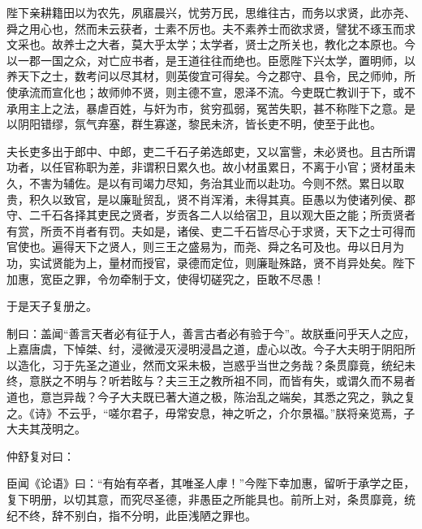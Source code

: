 \documentclass[]{article}
\begin{document}
陛下亲耕籍田以为农先，夙寤晨兴，忧劳万民，思维往古，而务以求贤，此亦尧、舜之用心也，然而未云获者，士素不厉也。夫不素养士而欲求贤，譬犹不琢玉而求文采也。故养士之大者，莫大乎太学；太学者，贤士之所关也，教化之本原也。今以一郡一国之众，对亡应书者，是王道往往而绝也。臣愿陛下兴太学，置明师，以养天下之士，数考问以尽其材，则英俊宜可得矣。今之郡守、县令，民之师帅，所使承流而宣化也；故师帅不贤，则主德不宣，恩泽不流。今吏既亡教训于下，或不承用主上之法，暴虐百姓，与奸为市，贫穷孤弱，冤苦失职，甚不称陛下之意。是以阴阳错缪，氛气弃塞，群生寡遂，黎民未济，皆长吏不明，使至于此也。

夫长吏多出于郎中、中郎，吏二千石子弟选郎吏，又以富訾，未必贤也。且古所谓功者，以任官称职为差，非谓积日累久也。故小材虽累日，不离于小官；贤材虽未久，不害为辅佐。是以有司竭力尽知，务治其业而以赴功。今则不然。累日以取贵，积久以致官，是以廉耻贸乱，贤不肖浑淆，未得其真。臣愚以为使诸列侯、郡守、二千石各择其吏民之贤者，岁贡各二人以给宿卫，且以观大臣之能；所贡贤者有赏，所贡不肖者有罚。夫如是，诸侯、吏二千石皆尽心于求贤，天下之士可得而官使也。遍得天下之贤人，则三王之盛易为，而尧、舜之名可及也。毋以日月为功，实试贤能为上，量材而授官，录德而定位，则廉耻殊路，贤不肖异处矣。陛下加惠，宽臣之罪，令勿牵制于文，使得切磋究之，臣敢不尽愚！

于是天子复册之。

制曰：盖闻``善言天者必有征于人，善言古者必有验于今''。故朕垂问乎天人之应，上嘉唐虞，下悼桀、纣，浸微浸灭浸明浸昌之道，虚心以改。今子大夫明于阴阳所以造化，习于先圣之道业，然而文采未极，岂惑乎当世之务哉？条贯靡竟，统纪未终，意朕之不明与？听若眩与？夫三王之教所祖不同，而皆有失，或谓久而不易者道也，意岂异哉？今子大夫既已著大道之极，陈治乱之端矣，其悉之究之，孰之复之。《诗》不云乎，``嗟尔君子，毋常安息，神之听之，介尔景福。''朕将亲览焉，子大夫其茂明之。

仲舒复对曰：

臣闻《论语》曰：``有始有卒者，其唯圣人虖！''今陛下幸加惠，留听于承学之臣，复下明册，以切其意，而究尽圣德，非愚臣之所能具也。前所上对，条贯靡竟，统纪不终，辞不别白，指不分明，此臣浅陋之罪也。
\end{document}
